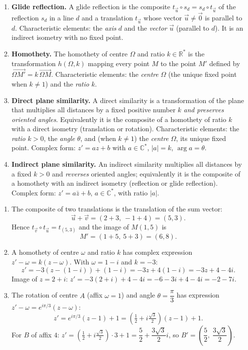 \documentclass[11pt]{article}
\begin{document}
\begin{corrige}
\begin{enumerate}
\item \textbf{Glide reflection.} A glide reflection is the composite $t_{\vec{u}} \circ s_d = s_d \circ t_{\vec{u}}$ of the reflection $s_d$ in a line $d$ and a translation $t_{\vec{u}}$ whose vector $\vec{u} \neq \vec{0}$ is parallel to $d$. Characteristic elements: the \emph{axis} $d$ and the \emph{vector} $\vec{u}$ (parallel to $d$). It is an indirect isometry with no fixed point.
\item \textbf{Homothety.} The homothety of centre $\Omega$ and ratio $k \in \mathbb{R}^*$ is the transformation $h(\Omega,k)$ mapping every point $M$ to the point $M'$ defined by $\overrightarrow{\Omega M'} = k\,\overrightarrow{\Omega M}$. Characteristic elements: the \emph{centre} $\Omega$ (the unique fixed point when $k \neq 1$) and the \emph{ratio} $k$.
\item \textbf{Direct plane similarity.} A direct similarity is a transformation of the plane that multiplies all distances by a fixed positive number $k$ \emph{and preserves oriented angles}. Equivalently it is the composite of a homothety of ratio $k$ with a direct isometry (translation or rotation). Characteristic elements: the \emph{ratio} $k > 0$, the \emph{angle} $\theta$, and (when $k \neq 1$) the \emph{centre} $\Omega$, its unique fixed point. Complex form: $z' = az + b$ with $a \in \mathbb{C}^*$, $|a| = k$, $\arg a = \theta$.
\item \textbf{Indirect plane similarity.} An indirect similarity multiplies all distances by a fixed $k > 0$ and \emph{reverses} oriented angles; equivalently it is the composite of a homothety with an indirect isometry (reflection or glide reflection). Complex form: $z' = a\bar{z} + b$, $a \in \mathbb{C}^*$, with ratio $|a|$.
\end{enumerate}
\end{corrige}

\begin{corrige}
\begin{enumerate}
\item The composite of two translations is the translation of the sum vector:
\[ \vec{u} + \vec{v} = (2+3,\ -1+4) = (5,3). \]
Hence $t_{\vec{v}}\circ t_{\vec{u}} = t_{(5,3)}$ and the image of $M(1,5)$ is
\[ M' = (1+5,\ 5+3) = (6,8). \]
\item A homothety of centre $\omega$ and ratio $k$ has complex expression $z' - \omega = k(z-\omega)$. With $\omega = 1-i$ and $k=-3$:
\[ z' = -3(z-(1-i)) + (1-i) = -3z + 4(1-i) = -3z + 4 - 4i. \]
Image of $z = 2+i$: $z' = -3(2+i) + 4 - 4i = -6 - 3i + 4 - 4i = -2 - 7i$.
\item The rotation of centre $A$ (affix $\omega = 1$) and angle $\theta = \dfrac{\pi}{3}$ has expression $z' - \omega = e^{i\pi/3}(z-\omega)$:
\[ z' = e^{i\pi/3}(z-1) + 1 = \left(\tfrac12 + i\tfrac{\sqrt3}{2}\right)(z-1) + 1. \]
For $B$ of affix $4$: $z' = \left(\tfrac12 + i\tfrac{\sqrt3}{2}\right)\cdot 3 + 1 = \dfrac{5}{2} + \dfrac{3\sqrt3}{2}i$, so $B' = \left(\dfrac{5}{2},\ \dfrac{3\sqrt3}{2}\right)$.
\end{enumerate}
\end{corrige}
\end{document}
